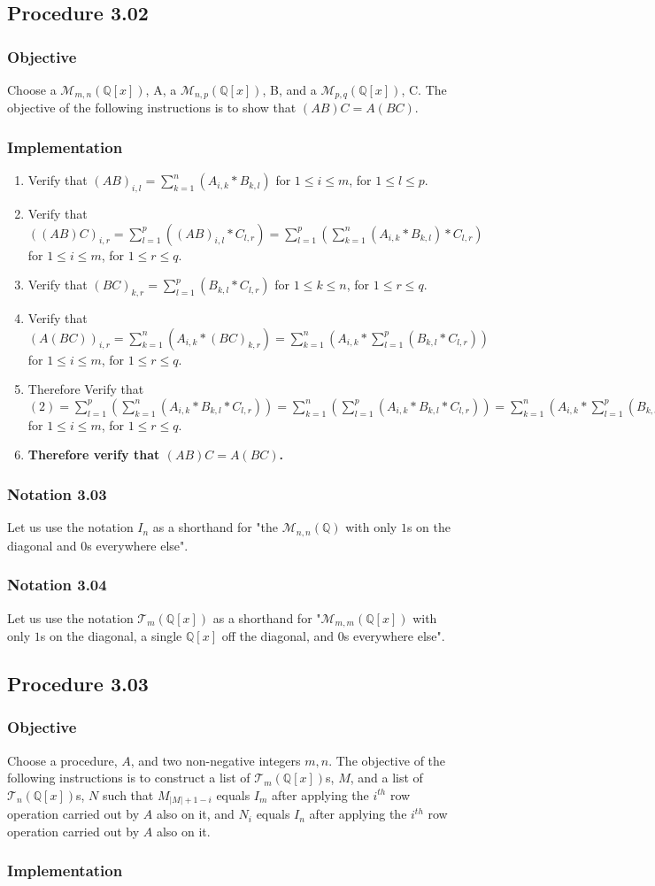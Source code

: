 \documentclass[twocolumn]{article}
\newcommand{\notation}[1]{\subsubsection*{Notation #1}}
\newcommand{\procedure}[2][]{\subsection*{Procedure #2 \ifthenelse{\equal{#1}{}}{}{(#1)}}\label{sec:procedure #2}}
\newcommand{\objective}{\subsubsection*{Objective}}
\newcommand{\implementation}{\subsubsection*{Implementation}}
\begin{document}
		\procedure{3.02}
			\objective
				Choose a $\mathcal{M}_{m,n}(\mathbb{Q}[x])$, A, a $\mathcal{M}_{n,p}(\mathbb{Q}[x])$, B, and a $\mathcal{M}_{p,q}(\mathbb{Q}[x])$, C. The objective of the following instructions is to show that $(AB)C=A(BC)$.
			\implementation
				\begin{enumerate}
					\item Verify that $(AB)_{i,l}=\sum_{k=1}^{n} \left(A_{i,k}*B_{k,l}\right)$ for $1\le i\le m$, for $1\le l\le p$.
					\item Verify that $((AB)C)_{i,r}=\sum_{l=1}^{p} \left((AB)_{i,l}*C_{l,r}\right)=\sum_{l=1}^{p} \left(\sum_{k=1}^{n} \left(A_{i,k}*B_{k,l}\right)*C_{l,r}\right)$ for $1\le i\le m$, for $1\le r\le q$.
					\item Verify that $(BC)_{k,r}=\sum_{l=1}^{p}\left(B_{k,l}*C_{l,r}\right)$ for $1\le k\le n$, for $1\le r\le q$.
					\item Verify that $(A(BC))_{i,r}=\sum_{k=1}^{n}\left(A_{i,k}*(BC)_{k,r}\right)=\sum_{k=1}^{n}\left(A_{i,k}*\sum_{l=1}^{p}\left(B_{k,l}*C_{l,r}\right)\right)$ for $1\le i\le m$, for $1\le r\le q$.
					\item Therefore Verify that $(2)=\sum_{l=1}^{p} \left(\sum_{k=1}^{n} \left(A_{i,k}*B_{k,l}*C_{l,r}\right)\right)=\sum_{k=1}^{n} \left(\sum_{l=1}^{p} \left(A_{i,k}*B_{k,l}*C_{l,r}\right)\right)=\sum_{k=1}^{n}\left(A_{i,k}*\sum_{l=1}^{p}\left(B_{k,l}*C_{l,r}\right)\right)=(4)$ for $1\le i\le m$, for $1\le r\le q$.
					\item \textbf{Therefore verify that $(AB)C=A(BC)$.}
				\end{enumerate}
		\notation{3.03}
			Let us use the notation $I_n$ as a shorthand for "the $\mathcal{M}_{n,n}(\mathbb{Q})$ with only $1$s on the diagonal and $0$s everywhere else".
		\notation{3.04}
			Let us use the notation $\mathcal{T}_{m}(\mathbb{Q}[x])$ as a shorthand for "$\mathcal{M}_{m,m}(\mathbb{Q}[x])$ with only $1$s on the diagonal, a single $\mathbb{Q}[x]$ off the diagonal, and $0$s everywhere else".
		\procedure{3.03}
			\objective
				Choose a procedure, $A$, and two non-negative integers $m,n$. The objective of the following instructions is to construct a list of $\mathcal{T}_{m}(\mathbb{Q}[x])$s, $M$, and a list of $\mathcal{T}_{n}(\mathbb{Q}[x])$s, $N$ such that $M_{\lvert M\rvert +1-i}$ equals $I_m$ after applying the $i^{th}$ row operation carried out by $A$ also on it, and $N_i$ equals $I_n$ after applying the $i^{th}$ row operation carried out by $A$ also on it.
			\implementation
\end{document}
